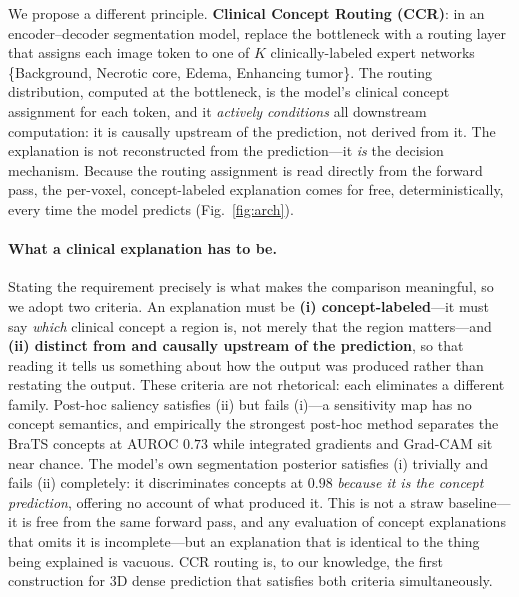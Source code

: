 \documentclass[runningheads]{llncs}
\begin{document}
We propose a different principle. \textbf{Clinical Concept Routing (CCR)}: in an
encoder--decoder segmentation model, replace the bottleneck with a routing layer that
assigns each image token to one of $K$ clinically-labeled expert networks
\{Background, Necrotic core, Edema, Enhancing tumor\}. The routing distribution, computed
at the bottleneck, is the model's clinical concept assignment for each token, and it
\emph{actively conditions} all downstream computation: it is causally upstream of the
prediction, not derived from it. The explanation is not reconstructed from the
prediction---it \emph{is} the decision mechanism. Because the routing assignment is read
directly from the forward pass, the per-voxel, concept-labeled explanation comes for free,
deterministically, every time the model predicts (Fig.~\ref{fig:arch}).

\paragraph{What a clinical explanation has to be.}
Stating the requirement precisely is what makes the comparison meaningful, so we adopt two
criteria. An explanation must be \textbf{(i) concept-labeled}---it must say \emph{which} clinical
concept a region is, not merely that the region matters---and \textbf{(ii) distinct from and
causally upstream of the prediction}, so that reading it tells us something about how the output
was produced rather than restating the output. These criteria are not rhetorical: each eliminates
a different family. Post-hoc saliency satisfies (ii) but fails (i)---a sensitivity map has no
concept semantics, and empirically the strongest post-hoc method separates the BraTS concepts at
AUROC $0.73$ while integrated gradients and Grad-CAM sit near chance. The model's own segmentation
posterior satisfies (i) trivially and fails (ii) completely: it discriminates concepts at $0.98$
\emph{because it is the concept prediction}, offering no account of what produced it. This is not a
straw baseline---it is free from the same forward pass, and any evaluation of concept explanations
that omits it is incomplete---but an explanation that is identical to the thing being explained is
vacuous. CCR routing is, to our knowledge, the first construction for 3D dense prediction that
satisfies both criteria simultaneously.
\end{document}

